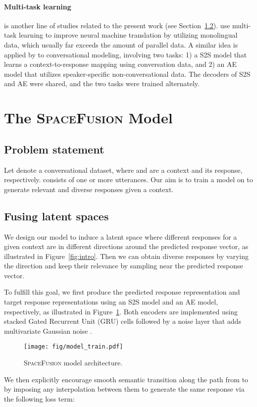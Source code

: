 \documentclass[11pt,a4paper]{article}
\begin{document}
\paragraph{Multi-task learning} is another line of studies related to the present work (see Section~\ref{sec:model}). \citet{sennrich2016nmt_mtask} use multi-task learning to improve neural machine translation by utilizing monolingual data, which usually far exceeds the amount of parallel data. A similar idea is applied by \citet{luan2017mtask} to conversational modeling, involving two tasks: 1) a S2S model that learns a context-to-response mapping using conversation data, and 2) an AE model that utilizes speaker-specific non-conversational data. The decoders of S2S and AE were shared, and the two tasks were trained alternately.
 
\section{The \textsc{SpaceFusion} Model}
\subsection{Problem statement}
Let  denote a conversational dataset, where  and  are a context and its response, respectively.  consists of one or more utterances. Our aim is to train a model on  to generate relevant and diverse responses given a context.


\subsection{Fusing latent spaces}
\label{sec:model}


We design our model to induce a latent space where different responses for a given context are in different directions around the predicted response vector, as illustrated in Figure~\ref{fig:intro}. Then we can obtain diverse responses by varying the direction and keep their relevance by sampling near the predicted response vector. 

To fulfill this goal, we first produce the predicted response representation  and target response representations  using an S2S model and an AE model, respectively, as illustrated in Figure~\ref{fig:model_train}. Both encoders are implemented using stacked Gated Recurrent Unit (GRU) \cite{cho2014gru} cells followed by a noise layer that adds multivariate Gaussian noise . 
\begin{figure}[tb]
    \centering
    \texttt{[image: fig/model\_train.pdf]}
    \caption{\textsc{SpaceFusion} model architecture.}
    \label{fig:model_train}
\end{figure}
We then explicitly encourage smooth semantic transition along the path from  to  by imposing any interpolation between them to generate the same response via the following loss term:
\end{document}
